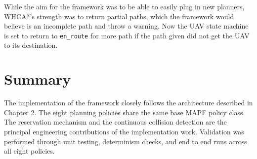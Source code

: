 \vspace{1em}

While the aim for the framework was to be able to easily plug in new planners, WHCA*'s strength was to return partial paths, which the framework would believe is an incomplete path and throw a warning. Now the UAV state machine is set to return to \texttt{en\_route} for more path if the path given did not get the UAV to its destination. \par

\vspace{1em}


\section{Summary}

The implementation of the framework closely follows the architecture described in Chapter 2. The eight planning policies share the same base MAPF policy class. The reservation mechanism and the continuous collision detection are the principal engineering contributions of the implementation work. Validation was performed through unit testing, determinism checks, and end to end runs across all eight policies.\par

\vspace{1em}